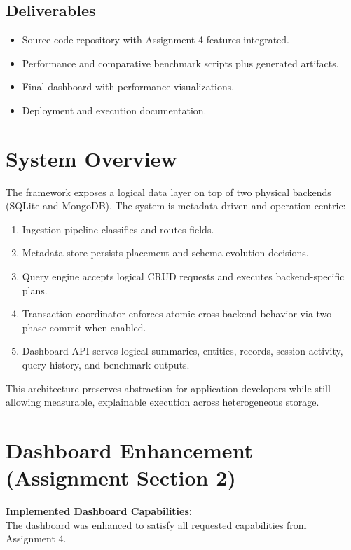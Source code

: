 \documentclass[12pt,a4paper]{article}
\begin{document}
\subsection{Deliverables}
\begin{itemize}
	\item Source code repository with Assignment 4 features integrated.
	\item Performance and comparative benchmark scripts plus generated artifacts.
	\item Final dashboard with performance visualizations.
	\item Deployment and execution documentation.
\end{itemize}

\section{System Overview}
The framework exposes a logical data layer on top of two physical backends (SQLite and MongoDB). The system is metadata-driven and operation-centric:
\begin{enumerate}
	\item Ingestion pipeline classifies and routes fields.
	\item Metadata store persists placement and schema evolution decisions.
	\item Query engine accepts logical CRUD requests and executes backend-specific plans.
	\item Transaction coordinator enforces atomic cross-backend behavior via two-phase commit when enabled.
	\item Dashboard API serves logical summaries, entities, records, session activity, query history, and benchmark outputs.
\end{enumerate}

This architecture preserves abstraction for application developers while still allowing measurable, explainable execution across heterogeneous storage.

\section{Dashboard Enhancement (Assignment Section 2)}

\textbf{Implemented Dashboard Capabilities:} \\
The dashboard was enhanced to satisfy all requested capabilities from Assignment 4.
\end{document}
